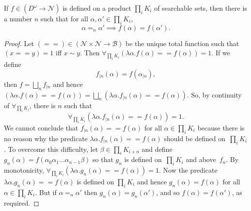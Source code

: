 \documentclass{LMCS}
\newcommand{\myomega}{\omega}
\newcommand{\licsmath}[1]{\[ #1 \]}
\newcommand{\pN}{\mathcal{N}}
\newcommand{\pBool}{\mathcal{B}}
\newcommand{\True}{1}\newcommand{\False}{0}\newcommand{\domain}[1]{{\D_{#1}}}
\newcommand{\D}{D}
\begin{document}
\begin{thm} \label{uniform:cont} If $f \in (D^\myomega \to \pN)$
  is defined on a product $\prod_i K_i$ of searchable sets, then there
  is a number $n$ such that for all $\alpha,\alpha' \in \prod_i K_i$,
  \,\,\licsmath{\alpha =_n \alpha' \implies f(\alpha)=f(\alpha').}
\end{thm}
\begin{proof}
  Let $(==) \in (\pN \times \pN \to \pBool)$ be the unique
  total function such that
$(x == y)=\True$ iff $x \sim y$. 
Then $\forall_{\prod_i {K_i}}(\lambda \alpha.f(\alpha) ==
  f(\alpha))=\True$.  If we define \[ f_{|n}(\alpha)=f(\alpha_{|n}),\]
  then $f=\bigsqcup_n f_{|n}$ and hence $(\lambda \alpha.f(\alpha) ==
  f(\alpha)) = \bigsqcup_n (\lambda \alpha.f_{|n}(\alpha) ==
  f(\alpha))$. So, by continuity of $\forall_{\prod_i {K_i}}$, there
  is $n$ such that \[ \forall_{\prod_i {K_i}}(\lambda
  \alpha.f_{|n}(\alpha) == f(\alpha))=\True.\] We cannot conclude that
  $f_{|n}(\alpha) == f(\alpha)$ for all $\alpha \in \prod_i K_i$
  because there is no reason why the predicate $\lambda
  \alpha.f_{|n}(\alpha) == f(\alpha)$ should be defined on~$\prod_i
  K_i$.  To overcome this difficulty, let $\beta \in \prod_{i} K_{i +
    n}$ and define
  $g_n(\alpha)=f(\alpha_0\alpha_1\dots\alpha_{n-1}\beta)$ so that
  $g_n$ is defined on~$\prod_i K_i$ and
  above~$f_n$. By monotonicity, $ \forall_{\prod_i {K_i}}(\lambda
  \alpha.g_n(\alpha) == f(\alpha))=\True.  $ Now the predicate
  $\lambda \alpha.g_n(\alpha) == f(\alpha)$ is defined on $\prod_i
  K_i$ and hence $g_n(\alpha) = f(\alpha)$ for all $\alpha \in \prod_i
  K_i$.  But if $\alpha =_n \alpha'$ then $g_n(\alpha)=g_n(\alpha')$,
  and so $f(\alpha)=f(\alpha')$, as required.
\end{proof}
\end{document}
